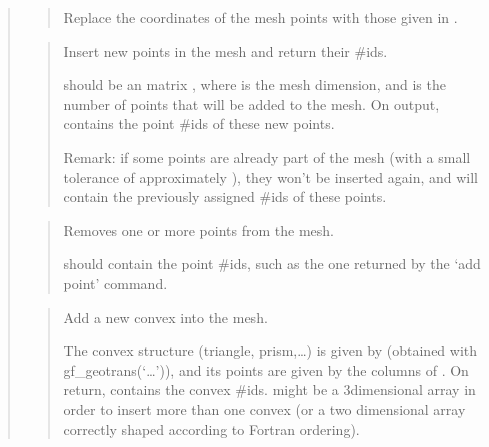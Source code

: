 \documentclass[a4paper,11pt,english]{sphinxmanual}
\begin{document}
\begin{quote}

\begin{quote}

Replace the coordinates of the mesh points with those given in .
\end{quote}

\begin{quote}

Insert new points in the mesh and return their \#ids.

 should be an  matrix , where  is the mesh
dimension, and  is the number of points that will be
added to the mesh. On output,  contains the point \#ids
of these new points.

Remark: if some points are already part of the mesh (with a small
tolerance of approximately ), they won’t be inserted again,
and  will contain the previously assigned \#ids of these
points.
\end{quote}

\begin{quote}

Removes one or more points from the mesh.

 should contain the point \#ids, such as the one returned by
the ‘add point’ command.
\end{quote}

\begin{quote}

Add a new convex into the mesh.

The convex structure (triangle, prism,…) is given by 
(obtained with gf\_geotrans(‘…’)), and its points are given by
the columns of . On return,  contains the convex \#ids.
 might be a 3\sphinxhyphen{}dimensional array in order to insert more than
one convex (or a two dimensional array correctly shaped according
to Fortran ordering).
\end{quote}


\end{quote}
\end{document}
